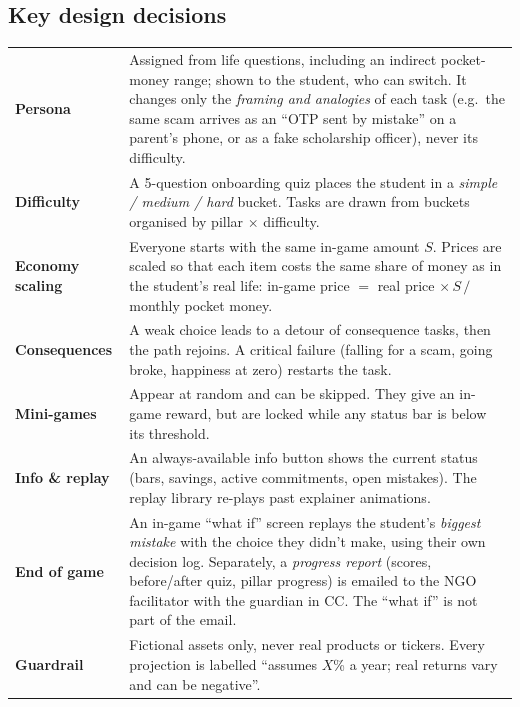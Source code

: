 \documentclass[10pt,a4paper]{article}
\begin{document}
\vspace{3pt}
\subsection{Key design decisions}
{\small
\begin{tabularx}{\textwidth}{@{}>{\bfseries}p{2.6cm}X@{}}
\toprule
Persona & Assigned from life questions, including an indirect pocket-money range; shown to the student, who can switch. It changes only the \emph{framing and analogies} of each task (e.g.\ the same scam arrives as an ``OTP sent by mistake'' on a parent's phone, or as a fake scholarship officer), never its difficulty.\\
Difficulty & A 5-question onboarding quiz places the student in a \emph{simple / medium / hard} bucket. Tasks are drawn from buckets organised by pillar $\times$ difficulty.\\
Economy scaling & Everyone starts with the same in-game amount $S$. Prices are scaled so that each item costs the same share of money as in the student's real life: in-game price $=$ real price $\times\, S \,/\,$ monthly pocket money.\\
Consequences & A weak choice leads to a detour of consequence tasks, then the path rejoins. A critical failure (falling for a scam, going broke, happiness at zero) restarts the task.\\
Mini-games & Appear at random and can be skipped. They give an in-game reward, but are locked while any status bar is below its threshold.\\
Info \& replay & An always-available info button shows the current status (bars, savings, active commitments, open mistakes). The replay library re-plays past explainer animations.\\
End of game & An in-game ``what if'' screen replays the student's \emph{biggest mistake} with the choice they didn't make, using their own decision log. Separately, a \emph{progress report} (scores, before/after quiz, pillar progress) is emailed to the NGO facilitator with the guardian in CC. The ``what if'' is not part of the email.\\
Guardrail & Fictional assets only, never real products or tickers. Every projection is labelled ``assumes $X$\% a year; real returns vary and can be negative''.\\
\bottomrule
\end{tabularx}}
\end{document}
